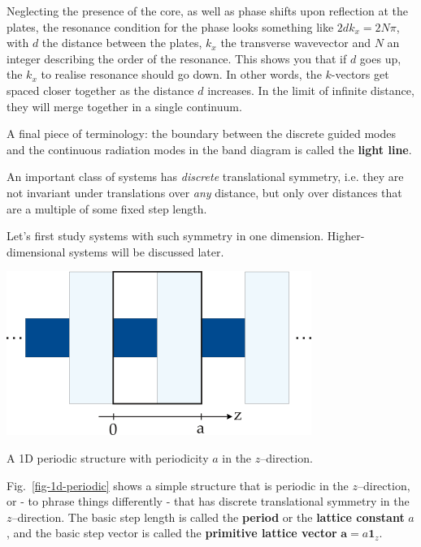 Neglecting the presence of the core, as well as phase shifts upon reflection at the plates, the resonance condition for the phase looks something like $2 d k_x =  2 N \pi$, with $d$ the distance between the plates, $k_x$ the transverse wavevector and $N$ an integer describing the order of the resonance. This shows you that if $d$ goes up, the $k_x$ to realise resonance should go down. In other words, the $k$-vectors get spaced closer together as the distance $d$ increases. In the limit of infinite distance, they will merge together in a single continuum.

A final piece of terminology: the boundary between the discrete guided modes and the continuous radiation modes in the band diagram is called the \textbf{light line}.



An important class of systems has \emph{discrete} translational symmetry, i.e. they are not invariant under translations over \emph{any} distance, but only over distances that are a multiple of some fixed step length.

Let's first study systems with such symmetry in one dimension. Higher-dimensional systems will be discussed later.

\begin{marginfigure}
\centering
\includegraphics{symmetry/figures/periodic}
\caption{A 1D periodic structure with periodicity $a$ in the $z$--direction.}
\label{fig-1d-periodic}
\end{marginfigure}

Fig.~\ref{fig-1d-periodic} shows a simple structure that is periodic in the $z$--direction, or - to phrase things differently - that has discrete translational symmetry in the $z$--direction. The basic step length is called the \textbf{period} or the \textbf{lattice constant} $a$, and the basic step vector is called the \textbf{primitive lattice vector} ${\mathbf a} = a {\mathbf 1}_z$.

